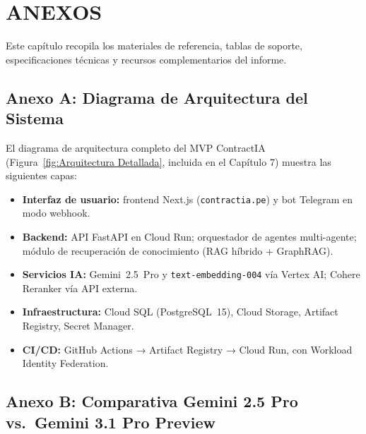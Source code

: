 \chapter*{\center \Large ANEXOS} 

Este capítulo recopila los materiales de referencia, tablas de soporte,
especificaciones técnicas y recursos complementarios del informe.

\section*{Anexo A: Diagrama de Arquitectura del Sistema}

El diagrama de arquitectura completo del MVP ContractIA (Figura~\ref{fig:Arquitectura Detallada},
incluida en el Capítulo 7) muestra las siguientes capas:

\begin{itemize}
    \item \textbf{Interfaz de usuario:} frontend Next.js (\texttt{contractia.pe})
    y bot Telegram en modo webhook.
    \item \textbf{Backend:} API FastAPI en Cloud Run; orquestador de agentes
    multi-agente; módulo de recuperación de conocimiento (RAG híbrido +
    GraphRAG).
    \item \textbf{Servicios IA:} Gemini~2.5~Pro y \texttt{text-embedding-004}
    vía Vertex AI; Cohere Reranker vía API externa.
    \item \textbf{Infraestructura:} Cloud SQL (PostgreSQL~15), Cloud Storage,
    Artifact Registry, Secret Manager.
    \item \textbf{CI/CD:} GitHub Actions → Artifact Registry → Cloud Run,
    con Workload Identity Federation.
\end{itemize}

\section*{Anexo B: Comparativa Gemini 2.5 Pro vs.\ Gemini 3.1 Pro Preview}

